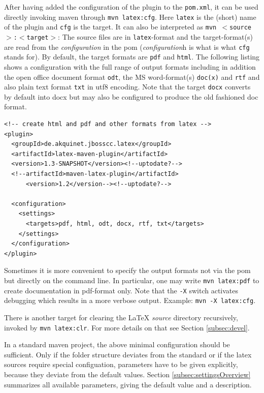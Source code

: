 \documentclass[12pt]{article}
\begin{document}
After having added the configuration of the plugin to the {\tt pom.xml}, 
it can be used directly invoking maven through 
{\tt mvn latex:cfg}. 
Here {\tt latex} is the (short) name of the plugin and {\tt cfg} is the target. 
It can also be interpreted as {\tt mvn $<$source$>$:$<$target$>$}: 
The source files are in {\tt latex}-format and the target-format(s) 
are read from the {\em configuration} in the pom 
({\em configuration}h is what is what {\tt cfg} stands for). 
By default, the target formats are {\tt pdf} and {\tt html}. 
The following listing shows a configuration 
with the full range of output formats including in addition 
the open office document format {\tt odt}, 
the MS word-format(s) {\tt doc(x)} and {\tt rtf}
and also plain text format {\tt txt} in utf8 encoding. 
Note that the target {\tt docx} converts by default into \gls{docx} 
but may also be configured to produce the old fashioned \gls{doc} format. 
%
\lstset{language=xml, basicstyle=\small}
\begin{lstlisting}
<!-- create html and pdf and other formats from latex -->
<plugin>
  <groupId>de.akquinet.jbosscc.latex</groupId>
  <artifactId>latex-maven-plugin</artifactId>
  <version>1.3-SNAPSHOT</version><!--uptodate?-->
  <!--artifactId>maven-latex-plugin</artifactId>
      <version>1.2</version--><!--uptodate?-->
	
  <configuration>
    <settings>
      <targets>pdf, html, odt, docx, rtf, txt</targets>
    </settings>
  </configuration>
</plugin>
\end{lstlisting}

Sometimes it is more convenient 
to specify the output formats not via the pom 
but directly on the command line. 
In particular, one may write {\tt mvn latex:pdf} to create documentation 
in pdf-format only. 
Note that the {\tt -X} switch activates debugging 
which results in a more verbose output. 
Example: {\tt mvn -X latex:cfg}. 

There is another target for clearing the LaTeX {\em source} directory 
recursively, invoked by {\tt mvn latex:clr}. 
For more details on that see Section \ref{subsec:devel}. 

In a standard maven project, 
the above minimal configuration should be sufficient. 
Only if the folder structure deviates from the standard 
or if the latex sources require special configuation, 
parameters have to be given explicitly, 
because they deviate from the default values. 
Section \ref{subsec:settingsOverview} summarizes all available parameters, 
giving the default value and a description. 
\end{document}
